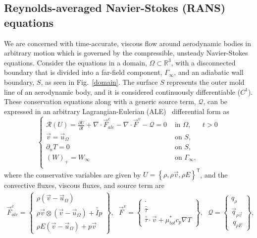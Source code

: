 
\subsection*{Reynolds-averaged Navier-Stokes (RANS) equations}
We are concerned with time-accurate, viscous flow around aerodynamic bodies in arbitrary motion which is governed by the compressible, unsteady Navier-Stokes equations. Consider the equations in a domain, $\Omega \subset \mathbb{R}^3 $, with a disconnected boundary that is divided into a far-field component, $\Gamma_\infty$, and an adiabatic wall boundary, $S$, as seen in Fig.~\ref{domain}. The surface $S$ represents the outer mold line of an aerodynamic body, and it is considered continuously differentiable ($C^1$). These conservation equations along with a generic source term, $\mathcal{Q}$, can be expressed in an arbitrary Lagrangian-Eulerian (ALE)~\cite{donea2004} differential form as
\begin{equation} \label{rans}
\left\{\begin{array} {lll}
\mathcal{R}(U) = \frac{\partial U}{\partial t} + \nabla \cdot \vec{F}^{c}_{ale} -  \nabla \cdot \vec{F}^{v} - \mathcal{Q} = 0 & \mbox{  in } \Omega, & t > 0  \\
\vec{v} = \vec{u}_\Omega &  \mbox{ on }  S,  \\
\partial_n T = 0 &  \mbox{ on }  S,   \\
(W)_+ = W_\infty  & \mbox{ on }  \Gamma_\infty, \\
\end{array}\right.
\end{equation}
where the conservative variables are given by $U = \left \{  \rho, \rho \vec{v},  \rho E \right \}^\mathsf{T}$, and the convective fluxes, viscous fluxes, and source term are
\begin{align} \label{fluxes}
\vec{F}^{c}_{ale} = \left \{ \begin{array}{c} \rho (\vec{v} - \vec{u}_\Omega)  \\ \rho \vec{v} \otimes  (\vec{v} - \vec{u}_\Omega) + \bar{\bar{I}} p \\ \rho E (\vec{v} - \vec{u}_\Omega) + p \vec{v}   \end{array} \right \},  ~ ~ ~
\vec{F}^{v} = \left \{ \begin{array}{c} \cdot \\ \bar{\bar{\tau}} \\ \bar{\bar{\tau}} \cdot \vec{v}  + \mu_{tot}^* c_p \nabla T\end{array} \right  \},  ~ ~ ~
\mathcal{Q} = \left \{ \begin{array}{c} q_{\rho} \\ \vec{q}_{\rho \vec{v}} \\ \ q_{\rho E}   \end{array} \right \}, 
\end{align} 
